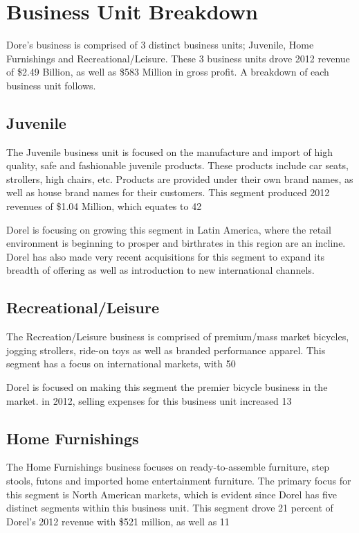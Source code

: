 \section{Business Unit Breakdown}
Dore’s business is comprised of 3 distinct business units; Juvenile, Home Furnishings and Recreational/Leisure.  These 3 business units drove 2012 revenue of \$2.49 Billion, as well as \$583 Million in gross profit. A breakdown of each business unit follows.

\subsection{Juvenile}
The Juvenile business unit is focused on the manufacture and import of high quality, safe and fashionable juvenile products.  These products include car seats, strollers, high chairs, etc.  Products are provided under their own brand names, as well as house brand names for their customers. This segment produced 2012 revenues of \$1.04 Million, which equates to 42%

Dorel is focusing on growing this segment in Latin America, where the retail environment is beginning to prosper and birthrates in this region are an incline. Dorel has also made very recent acquisitions for this segment to expand its breadth of offering as well as introduction to new international channels.

\subsection{Recreational/Leisure}
The Recreation/Leisure business is comprised of premium/mass market bicycles, jogging strollers, ride-on toys as well as branded performance apparel.  This segment has a focus on international markets, with 50%

Dorel is focused on making this segment the premier bicycle business in the market. in 2012, selling expenses for this business unit increased 13%

\subsection{Home Furnishings}
The Home Furnishings business focuses on ready-to-assemble furniture, step stools, futons and imported home entertainment furniture.  The primary focus for this segment is North American markets, which is evident since Dorel has five distinct segments within this business unit. This segment drove 21 percent of Dorel’s 2012 revenue with \$521 million, as well as 11%

